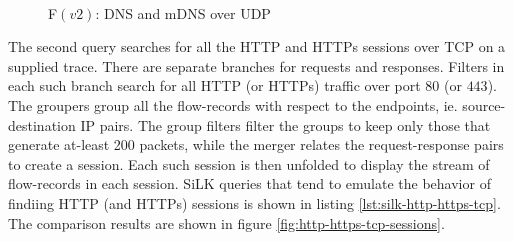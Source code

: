 \begin{figure}[ht!]
\centering
{}\quad
{}\\
\caption{F$(v2)$: DNS and mDNS over UDP}
\label{fig:dns-mdns-udp}
\end{figure}


The second query searches for all the HTTP and HTTPs sessions over TCP on a
supplied trace. There are separate branches for requests and responses.
Filters in each such branch search for all HTTP (or HTTPs) traffic over port
$80$ (or $443$). The groupers group all the flow-records with respect to the
endpoints, ie. source-destination IP pairs. The group  filters filter the groups to keep only those that
generate at-least 200 packets, while the merger relates the request-response
pairs to create a session. Each such session is then unfolded to display the
stream of flow-records in each session. SiLK queries that tend to emulate the
behavior of findiing HTTP (and HTTPs) sessions is shown in listing
\ref{lst:silk-http-https-tcp}. The comparison results are shown in figure
\ref{fig:http-https-tcp-sessions}.


